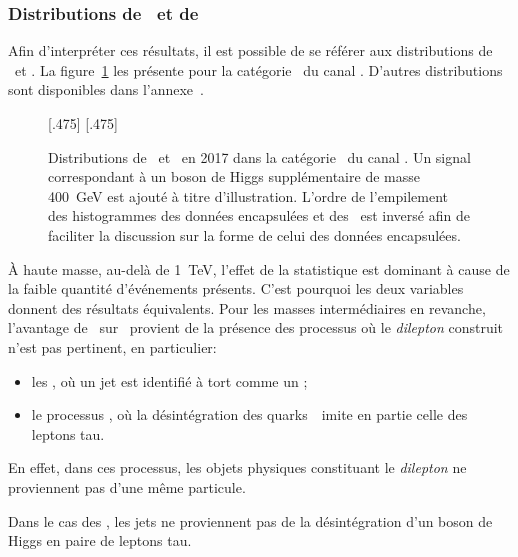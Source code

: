 \subsubsection{Distributions de \mml\ et de \mTtot}
Afin d'interpréter ces résultats, il est possible de se référer aux distributions de \mTtot\ et \mml.
La figure~\ref{fig-distributions_mml_mttot_2017_tt_btag} les présente pour la catégorie \CATbtag\ du canal \tauh\tauh.
D'autres distributions sont disponibles dans l'annexe~.
\begin{figure}[h]
\centering

[.475\textwidth]
{}
\hfill
{}[.475\textwidth]
{}

\caption[Distributions de \mTtot\ et \mml\ en 2017 dans la catégorie \CATbtag\ du canal \tauh\tauh.]{Distributions de \mTtot\ et \mml\ en 2017 dans la catégorie \CATbtag\ du canal \tauh\tauh. Un signal correspondant à un boson de Higgs supplémentaire de masse \SI{400}{\GeV} est ajouté à titre d'illustration. L'ordre de l'empilement des histogrammes des données encapsulées et des \ftauhs\ est inversé afin de faciliter la discussion sur la forme de celui des données encapsulées.}
\label{fig-distributions_mml_mttot_2017_tt_btag}
\end{figure}
\par
À haute masse,
au-delà de \SI{1}{\TeV},
l'effet de la statistique est dominant
à cause de la faible quantité d'événements présents.
C'est pourquoi les deux variables donnent des résultats équivalents.
Pour les masses intermédiaires en revanche,
l'avantage de \mTtot\ sur \mml\ provient de la présence des processus où
le \emph{dilepton} construit n'est pas pertinent,
en particulier:
\begin{itemize}
\item les \ftauhs, où un jet est identifié à tort comme un \tauh;
\item le processus \ttbar, où la désintégration des quarks~\quarkt\ imite en partie celle des leptons tau.
\end{itemize}
En effet, dans ces processus,
les objets physiques constituant le \emph{dilepton}
ne proviennent pas d'une même particule.
\par
Dans le cas des \ftauhs,
les jets ne proviennent pas de la désintégration d'un boson de Higgs en paire de leptons tau.
